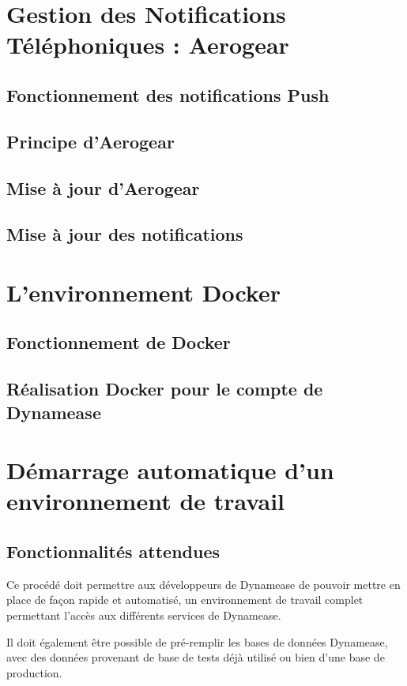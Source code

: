 \section{Gestion des Notifications Téléphoniques : Aerogear}
\subsection{Fonctionnement des notifications Push}
\subsection{Principe d'Aerogear}
\subsection{Mise à jour d'Aerogear}
\subsection{Mise à jour des notifications}

\section{L'environnement Docker}
\subsection{Fonctionnement de Docker}
\subsection{Réalisation Docker pour le compte de Dynamease}

\section{Démarrage automatique d'un environnement de travail}

\subsection{Fonctionnalités attendues}

Ce procédé doit permettre aux développeurs de Dynamease de pouvoir mettre en place de façon rapide et automatisé, un environnement de travail complet permettant l'accès aux différents services de Dynamease. 

Il doit également être possible de pré-remplir les bases de données Dynamease, avec des données provenant de base de tests déjà utilisé ou bien d'une base de production.

